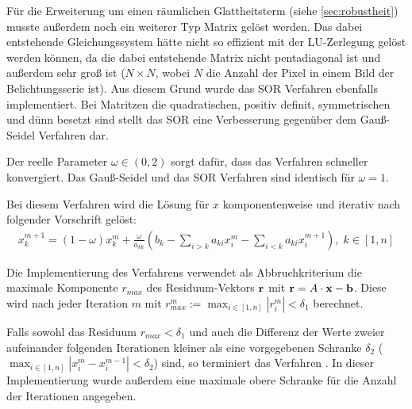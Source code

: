 Für die Erweiterung um einen räumlichen Glattheitsterm (siehe \autoref{sec:robustheit}) musste außerdem noch ein weiterer Typ Matrix gelöst werden. Das dabei entstehende Gleichungssystem hätte nicht so effizient mit der LU-Zerlegung gelöst werden können, da die dabei entstehende Matrix nicht pentadiagonal ist und außerdem sehr groß ist ($N \times N$, wobei $N$ die Anzahl der Pixel in einem Bild der Belichtungsserie ist). Aus diesem Grund wurde das \gls{SOR} Verfahren ebenfalls implementiert. Bei Matritzen die quadratischen, positiv definit, symmetrischen und dünn besetzt sind stellt das \gls{SOR} eine Verbesserung gegenüber dem Gauß-Seidel Verfahren dar. 

Der reelle Parameter $\omega \in (0,2)$ sorgt dafür, dass das Verfahren schneller konvergiert. Das Gauß-Seidel und das \gls{SOR} Verfahren sind identisch für $\omega = 1 $.

Bei diesem Verfahren wird die Lösung für $x$ komponentenweise und iterativ nach folgender Vorschrift gelöst:
\begin{align}
x_k^{m+1} = (1-\omega)x_k^m+ \frac{\omega}{a_{kk}}(b_k - \sum_{i>k} a_{ki}x_i^m - \sum_{i<k} a_{ki}x_{i}^{m+1}) ,\; k \in [1, n]
\end{align}

Die Implementierung des Verfahrens verwendet als Abbruchkriterium die maximale Komponente $r_{max}$ des Residuum-Vektors $\mathbf r$ mit $\mathbf r = A \cdot \mathbf x - \mathbf b$. Diese wird nach jeder Iteration $m$ mit $r_{max}^m := \max_{i\in [1,n]} |r_i^m| < \delta_1$ berechnet.

Falls sowohl das Residuum $r_{max} < \delta_1$ und auch die Differenz der Werte zweier aufeinander folgenden Iterationen kleiner als eine vorgegebenen Schranke $\delta_2$ ($\max_{i\in [1,n]} |x_i^m - x_i^{m-1}| < \delta_2$) sind, so terminiert das Verfahren \cite[S. 143]{Westermann2008}. In dieser Implementierung wurde außerdem eine maximale obere Schranke für die Anzahl der Iterationen angegeben.


